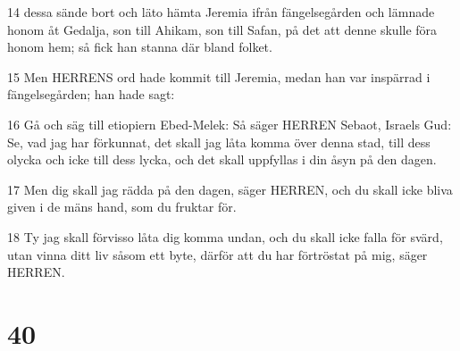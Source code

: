 \par 14 dessa sände bort och läto hämta Jeremia ifrån fängelsegården och lämnade honom åt Gedalja, son till Ahikam, son till Safan, på det att denne skulle föra honom hem; så fick han stanna där bland folket.
\par 15 Men HERRENS ord hade kommit till Jeremia, medan han var inspärrad i fängelsegården; han hade sagt:
\par 16 Gå och säg till etiopiern Ebed-Melek: Så säger HERREN Sebaot, Israels Gud: Se, vad jag har förkunnat, det skall jag låta komma över denna stad, till dess olycka och icke till dess lycka, och det skall uppfyllas i din åsyn på den dagen.
\par 17 Men dig skall jag rädda på den dagen, säger HERREN, och du skall icke bliva given i de mäns hand, som du fruktar för.
\par 18 Ty jag skall förvisso låta dig komma undan, och du skall icke falla för svärd, utan vinna ditt liv såsom ett byte, därför att du har förtröstat på mig, säger HERREN.

\chapter{40}

